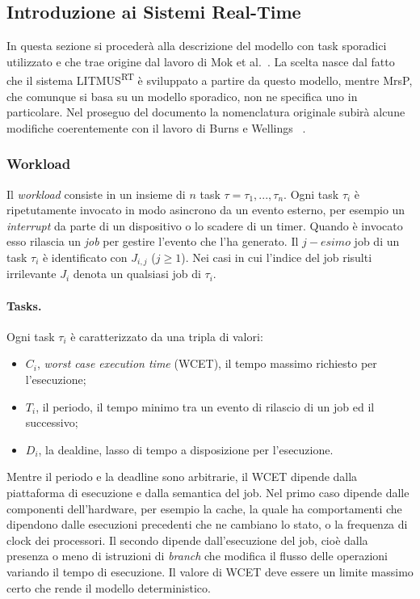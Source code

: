 \subsection{Introduzione ai Sistemi Real-Time}
\label{sec:overviewRTS}

In questa sezione si procederà alla descrizione del modello con task sporadici utilizzato e che trae origine dal lavoro di Mok et al.~\cite{Sha:2004:RTS:1028913.1028959}. La scelta nasce dal fatto che il sistema LITMUS\textsuperscript{RT} è sviluppato a partire da questo modello, mentre MrsP, che comunque si basa su un modello sporadico, non ne specifica uno in particolare. Nel proseguo del documento la nomenclatura originale subirà alcune modifiche coerentemente con il lavoro di Burns e Wellings ~\cite{Burns:2013:SCM:2547348.2547350}.

\subsubsection{Workload}
\label{sec:overviewWL}

Il \textit{workload} consiste in un insieme di $n$ task $\tau = {\tau_1, ... , \tau_n}$. Ogni task $\tau_i$ è ripetutamente invocato in modo asincrono da un evento esterno, per esempio un \textit{interrupt} da parte di un dispositivo o lo scadere di un timer. Quando è invocato esso rilascia un \textit{job} per gestire l'evento che l'ha generato. Il $j-esimo$ job di un task $\tau_i$ è identificato con $J_{i,j}$ ($j \geq 1$). Nei casi in cui l'indice del job risulti irrilevante $J_i$ denota un qualsiasi job di $\tau_i$.\\

\paragraph{Tasks.} Ogni task $\tau_i$ è caratterizzato da una tripla di valori:\\
\begin{itemize}
	\item $C_i$, \textit{worst case execution time} (WCET), il tempo massimo richiesto per l'esecuzione;
	\item $T_i$, il periodo, il tempo minimo tra un evento di rilascio di un job ed il successivo;
	\item $D_i$, la dealdine, lasso di tempo a disposizione per l'esecuzione.\\
\end{itemize}

Mentre il periodo e la deadline sono arbitrarie, il WCET dipende dalla piattaforma di esecuzione e dalla semantica del job. Nel primo caso dipende dalle componenti dell'hardware, per esempio la cache, la quale ha comportamenti che dipendono dalle esecuzioni precedenti che ne cambiano lo stato, o la frequenza di clock dei processori. Il secondo dipende dall'esecuzione del job, cioè dalla presenza o meno di istruzioni di \textit{branch} che modifica il flusso delle operazioni variando il tempo di esecuzione. Il valore di WCET deve essere un limite massimo certo che rende il modello deterministico.\\

